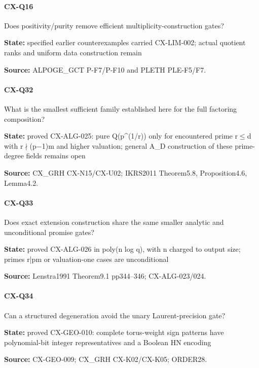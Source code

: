 \documentclass[11pt,a4paper]{article}
\begin{document}
\paragraph{CX-Q16} Does positivity/\allowbreak{}purity remove efficient multiplicity-construction gates?

\textbf{State:} specified earlier counterexamples carried CX-LIM-002; actual quotient ranks and uniform data construction remain

\textbf{Source:} ALPOGE\_\allowbreak{}GCT P-F7/\allowbreak{}P-F10 and PLETH PLE-F5/\allowbreak{}F7.

\paragraph{CX-Q32} What is the smallest sufficient family established here for the full factoring composition?

\textbf{State:} proved CX-ALG-025:\allowbreak{} pure Q(p\textasciicircum{}(1/\allowbreak{}r)) only for encountered prime r\ensuremath{\le}d with r\ensuremath{\nmid}(p\ensuremath{-}1)m and higher valuation; general A\_\allowbreak{}D construction of these prime-degree fields remains open

\textbf{Source:} CX\_\allowbreak{}GRH CX-N15/\allowbreak{}CX-U02; IKRS2011 Theorem5.\allowbreak{}8, Proposition4.\allowbreak{}6, Lemma4.\allowbreak{}2.

\paragraph{CX-Q33} Does exact extension construction share the same smaller analytic and unconditional promise gates?

\textbf{State:} proved CX-ALG-026 in poly(n log q), with n charged to output size; primes r|pm or valuation-one cases are unconditional

\textbf{Source:} Lenstra1991 Theorem9.\allowbreak{}1 pp344–\allowbreak{}346; CX-ALG-023/\allowbreak{}024.

\paragraph{CX-Q34} Can a structured degeneration avoid the unary Laurent-precision gate?

\textbf{State:} proved CX-GEO-010:\allowbreak{} complete torus-weight sign patterns have polynomial-bit integer representatives and a Boolean HN encoding

\textbf{Source:} CX-GEO-009; CX\_\allowbreak{}GRH CX-K02/\allowbreak{}CX-K05; ORDER28.
\end{document}
